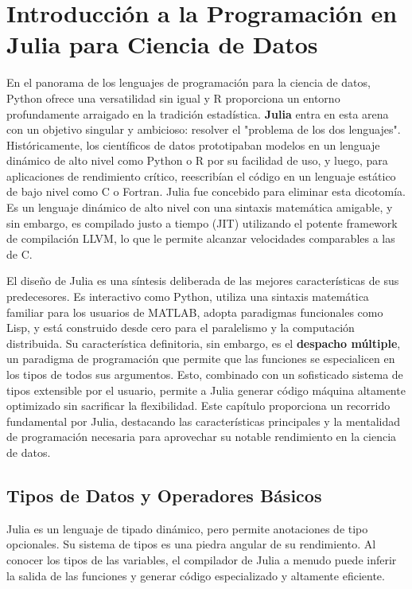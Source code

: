 \cleardoublepage
{}

\chapter*{Introducción a la Programación en Julia para Ciencia de Datos}
\label{chap:julia_intro}

En el panorama de los lenguajes de programación para la ciencia de datos, Python ofrece una versatilidad sin igual y R proporciona un entorno profundamente arraigado en la tradición estadística. \textbf{Julia} entra en esta arena con un objetivo singular y ambicioso: resolver el "problema de los dos lenguajes". Históricamente, los científicos de datos prototipaban modelos en un lenguaje dinámico de alto nivel como Python o R por su facilidad de uso, y luego, para aplicaciones de rendimiento crítico, reescribían el código en un lenguaje estático de bajo nivel como C o Fortran. Julia fue concebido para eliminar esta dicotomía. Es un lenguaje dinámico de alto nivel con una sintaxis matemática amigable, y sin embargo, es compilado justo a tiempo (JIT) utilizando el potente framework de compilación LLVM, lo que le permite alcanzar velocidades comparables a las de C.

El diseño de Julia es una síntesis deliberada de las mejores características de sus predecesores. Es interactivo como Python, utiliza una sintaxis matemática familiar para los usuarios de MATLAB, adopta paradigmas funcionales como Lisp, y está construido desde cero para el paralelismo y la computación distribuida. Su característica definitoria, sin embargo, es el \textbf{despacho múltiple}, un paradigma de programación que permite que las funciones se especialicen en los tipos de todos sus argumentos. Esto, combinado con un sofisticado sistema de tipos extensible por el usuario, permite a Julia generar código máquina altamente optimizado sin sacrificar la flexibilidad. Este capítulo proporciona un recorrido fundamental por Julia, destacando las características principales y la mentalidad de programación necesaria para aprovechar su notable rendimiento en la ciencia de datos.

\section{Tipos de Datos y Operadores Básicos}
\label{sec:julia_data_types}
Julia es un lenguaje de tipado dinámico, pero permite anotaciones de tipo opcionales. Su sistema de tipos es una piedra angular de su rendimiento. Al conocer los tipos de las variables, el compilador de Julia a menudo puede inferir la salida de las funciones y generar código especializado y altamente eficiente.


